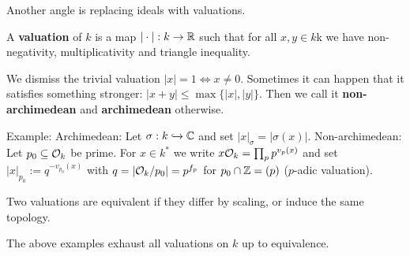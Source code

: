 \begin{outline}
\0 Another angle is replacing ideals with valuations. 

\0 \begin{definition}
    A \textbf{valuation} of $k$ is a map $|\cdot| : k\rightarrow \mathbb{R}$ such that for all $x,y\in k$k we have non-negativity, multiplicativity and triangle inequality.
\end{definition}

\1 We dismiss the trivial valuation $|x|=1 \iff x\neq 0$.
\1 Sometimes it can happen that it satisfies something stronger: $|x+y|\leq \max \{ |x|,|y|\}$. Then we call it \textbf{non-archimedean} and \textbf{archimedean} otherwise. 

\1 Example: 
    \2 Archimedean: Let $\sigma: k \xhookrightarrow{} \mathbb{C}$ and set $|x|_\sigma = |\sigma(x)|$.
    \2 Non-archimedean: Let $p_0 \subseteq \mathcal{O}_k$ be prime. For $x\in k^*$ we write $x\mathcal{O}_k = \prod_p p^{v_p(x)}$ and set $|x|_{p_0}:=q^{-v_{p_0}(x)}$ with $q=|\mathcal{O}_k / p_0|=p^{f_p}$ for $p_0 \cap \mathbb{Z} = (p)$ ($p$-adic valuation). 

\0 \begin{definition}
    Two valuations are equivalent if they differ by scaling, or induce the same topology.
\end{definition}

\0 \begin{theorem}
    The above examples exhaust all valuations on $k$ up to equivalence. 
\end{theorem}
\end{outline}





  